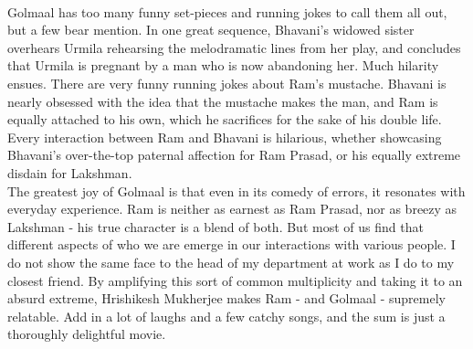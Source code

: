 \documentclass{article}
\begin{document}
\\
Golmaal has too many funny set-pieces and running jokes to call them all out, but a few bear mention.  In one great sequence, Bhavani's widowed sister overhears Urmila rehearsing the melodramatic lines from her play, and concludes that Urmila is pregnant by a man who is now abandoning her.  Much hilarity ensues.  There are very funny running jokes about Ram's mustache.  Bhavani is nearly obsessed with the idea that the mustache makes the man, and Ram is equally attached to his own, which he sacrifices for the sake of his double life.  Every interaction between Ram and Bhavani is hilarious, whether showcasing Bhavani's over-the-top paternal affection for Ram Prasad, or his equally extreme disdain for Lakshman. 
\\
The greatest joy of Golmaal is that even in its comedy of errors, it resonates with everyday experience.  Ram is neither as earnest as Ram Prasad, nor as breezy as Lakshman - his true character is a blend of both.  But most of us find that different aspects of who we are emerge in our interactions with various people.  I do not show the same face to the head of my department at work as I do to my closest friend.  By amplifying this sort of common multiplicity and taking it to an absurd extreme, Hrishikesh Mukherjee makes Ram - and Golmaal - supremely relatable.  Add in a lot of laughs and a few catchy songs, and the sum is just a thoroughly delightful movie. 
\end{document}
